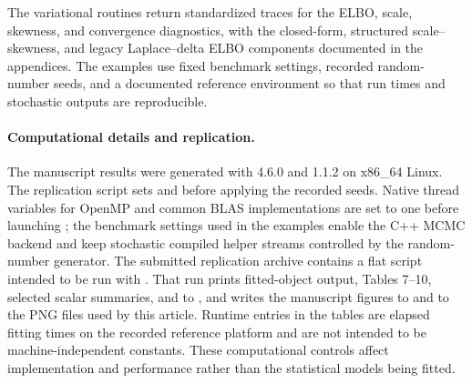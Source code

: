 \documentclass{jss}
\begin{document}
The variational routines return standardized traces for the ELBO, scale, skewness, and convergence diagnostics, with the closed-form, structured scale--skewness, and legacy Laplace--delta ELBO components documented in the appendices. The examples use fixed benchmark settings, recorded random-number seeds, and a documented reference environment so that run times and stochastic outputs are reproducible.

\paragraph{Computational details and replication.}
The manuscript results were generated with  4.6.0 and  1.1.2 on x86\_64 Linux. The replication script sets  and  before applying the recorded seeds. Native thread variables for OpenMP and common BLAS implementations are set to one before launching ; the benchmark settings used in the examples enable the  C++ MCMC backend and keep stochastic compiled helper streams controlled by the  random-number generator. The submitted replication archive contains a flat  script intended to be run with . That run prints fitted-object output, Tables 7--10, selected scalar summaries, and  to , and writes the manuscript figures to  and to the PNG files used by this article. Runtime entries in the tables are elapsed fitting times on the recorded reference platform and are not intended to be machine-independent constants.
These computational controls affect implementation and performance rather than the statistical models being fitted.
\end{document}
